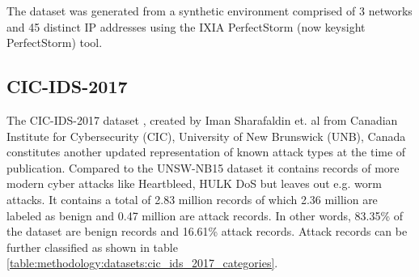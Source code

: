 The dataset was generated from a synthetic environment comprised of 3 networks and 45 distinct IP addresses using the IXIA PerfectStorm (now keysight PerfectStorm) tool.

\subsection{CIC-IDS-2017}

The CIC-IDS-2017 dataset \cite{cic_ids_2017}, created by Iman Sharafaldin et. al from Canadian Institute for Cybersecurity (CIC), University of New Brunswick (UNB), Canada constitutes another updated representation of known attack types at the time of publication. Compared to the UNSW-NB15 dataset it contains records of more modern cyber attacks like Heartbleed, HULK DoS but leaves out e.g. worm attacks. It contains a total of 2.83 million records of which 2.36 million are labeled as benign and 0.47 million are attack records. In other words, 83.35\% of the dataset are benign records and 16.61\% attack records. Attack records can be further classified as shown in table \ref{table:methodology:datasets:cic_ids_2017_categories}.

